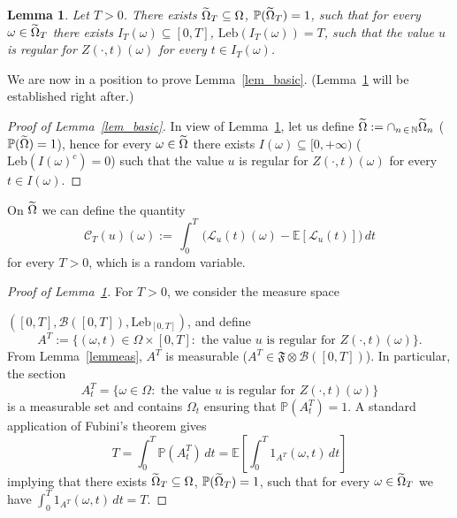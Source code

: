 \documentclass[10pt]{amsart}
\newtheorem{lemm}[theo]{Lemma}\newtheorem{prop}[theo]{Proposition}\newtheorem{coro}[theo]{Corollary}\newtheorem{conj}[theo]{Conjecture}
\theoremstyle{definition}\newtheorem{defi}[theo]{Definition}\newtheorem{rema}[theo]{Remark}\newtheorem{exam}[theo]{Example}\newtheorem{exem}[theo]{Example}\newtheorem{nota}[theo]{Notation}
\newcommand{\clC}{\mathcal{C}}
\newcommand{\clL}{\mathcal{L}}
\newcommand{\bbP}{\mathbb{P}}
\newcommand{\bbE}{\mathbb{E}}
\newcommand{\bbN}{\mathbb{N}}
\let\oldtilde\tilde
\renewcommand*{\tilde}[1]{\mathchoice{\widetilde{#1}}{\widetilde{#1}}{\oldtilde{#1}}{\oldtilde{#1}}}
\begin{document}
\begin{lemm}\label{lemreg}
Let $T>0$. There exists $\tilde \Omega_T \subseteq \Omega$, $\bbP(\tilde \Omega_T)=1$, such that for every $\omega\in \tilde\Omega_T$ there exists $I_T(\omega)\subseteq [0,T]$, $\mathrm{Leb} (I_T(\omega))=T$, such that the value $u$ is regular for $Z(\cdot, t)(\omega) $ for every $t\in I_T(\omega)$.
\end{lemm}

We are now in a position to prove Lemma~\ref{lem_basic}. (Lemma~\ref{lemreg} will be established right after.)

\begin{proof}[Proof of Lemma~\ref{lem_basic}]
In view of Lemma~\ref{lemreg}, let us define $\tilde \Omega:=\cap_{n\,\in\,\bbN} \tilde \Omega_n$ ($\bbP(\tilde \Omega)=1$), hence for every $\omega\in \tilde \Omega$ there exists $I(\omega)\subseteq [0,+\infty)$ ($\mathrm{Leb}(I(\omega)^c) = 0$) such that the value $u$ is regular for $ Z(\cdot, t)(\omega)$ for every $t\in I(\omega)$.
\end{proof}

On $\tilde \Omega$ we can define the quantity
\begin{equation*}
\clC_{T}(u)(\omega):=\,\int_{0}^{T}\,\Big(\clL_{u}(t)(\omega)-
\bbE[\clL_{u}(t)]\Big)\,dt
\end{equation*}
for every $T>0$, which is a random variable.

\begin{proof}[Proof of Lemma~\ref{lemreg}]
For $T>0$, we consider the measure space

$([0,T], \mathcal B([0,T]), \text{Leb}_{[0,T]})$, and define
\[
A^T := \{ (\omega, t)\in \Omega \times [0,T] : \text{ the value } u \text{ is regular for } Z(\cdot, t)(\omega)\}.
\]
From Lemma~\ref{lemmeas}, $A^T$ is measurable ($A^T \in \mathfrak F\otimes \mathcal B([0,T])$). In particular, the section
\[
A^T_t = \{ \omega\in \Omega : \text{ the value } u \text{ is regular for } Z(\cdot, t)(\omega)\}
\]
is a measurable set and contains $\Omega_t$ ensuring that $\bbP(A^T_t)=1$. A standard application of Fubini's theorem gives
\begin{equation}\label{meas0}
T = \int_0^T \bbP(A^T_t)\,dt = \mathbb E \left [\int_0^T 1_{A^T}(\omega,t)\,dt
\right]
\end{equation}
implying that there exists $\tilde \Omega_T\subseteq \Omega$, $\bbP(\tilde \Omega_T) =1$, such that for every $\omega\in \tilde \Omega_T$ we have $
\int_0^T 1_{A^T}(\omega,t)\,dt = T. $
\end{proof}
\end{document}
